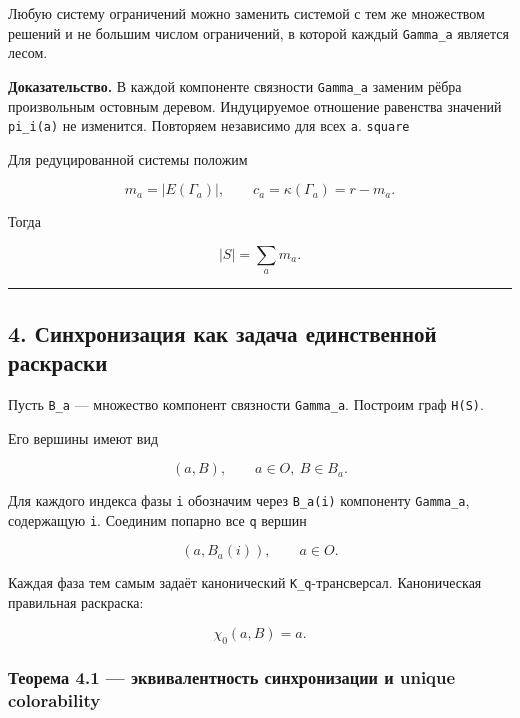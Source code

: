 Любую систему ограничений можно заменить системой с тем же множеством
решений и не большим числом ограничений, в которой каждый
\texttt{Gamma\_a} является лесом.

\textbf{Доказательство.} В каждой компоненте связности \texttt{Gamma\_a}
заменим рёбра произвольным остовным деревом. Индуцируемое отношение
равенства значений \texttt{pi\_i(a)} не изменится. Повторяем независимо
для всех \texttt{a}. \texttt{square}

Для редуцированной системы положим

\[
m_a=|E(\Gamma_a)|,
\qquad
c_a=\kappa(\Gamma_a)=r-m_a.
\tag{9}
\]

Тогда

\[
|S|=\sum_a m_a.
\tag{10}
\]

\begin{center}\rule{0.5\linewidth}{0.5pt}\end{center}

\hypertarget{ux441ux438ux43dux445ux440ux43eux43dux438ux437ux430ux446ux438ux44f-ux43aux430ux43a-ux437ux430ux434ux430ux447ux430-ux435ux434ux438ux43dux441ux442ux432ux435ux43dux43dux43eux439-ux440ux430ux441ux43aux440ux430ux441ux43aux438}{%
\subsection{4. Синхронизация как задача единственной
раскраски}\label{ux441ux438ux43dux445ux440ux43eux43dux438ux437ux430ux446ux438ux44f-ux43aux430ux43a-ux437ux430ux434ux430ux447ux430-ux435ux434ux438ux43dux441ux442ux432ux435ux43dux43dux43eux439-ux440ux430ux441ux43aux440ux430ux441ux43aux438}}

Пусть \texttt{B\_a} --- множество компонент связности \texttt{Gamma\_a}.
Построим граф \texttt{H(S)}.

Его вершины имеют вид

\[
(a,B),\qquad a\in O,\ B\in B_a.
\tag{11}
\]

Для каждого индекса фазы \texttt{i} обозначим через \texttt{B\_a(i)}
компоненту \texttt{Gamma\_a}, содержащую \texttt{i}. Соединим попарно
все \texttt{q} вершин

\[
(a,B_a(i)),\qquad a\in O.
\tag{12}
\]

Каждая фаза тем самым задаёт канонический \texttt{K\_q}-трансверсал.
Каноническая правильная раскраска:

\[
\chi_0(a,B)=a.
\tag{13}
\]

\hypertarget{ux442ux435ux43eux440ux435ux43cux430-4.1-ux44dux43aux432ux438ux432ux430ux43bux435ux43dux442ux43dux43eux441ux442ux44c-ux441ux438ux43dux445ux440ux43eux43dux438ux437ux430ux446ux438ux438-ux438-unique-colorability}{%
\subsubsection{Теорема 4.1 --- эквивалентность синхронизации и unique
colorability}\label{ux442ux435ux43eux440ux435ux43cux430-4.1-ux44dux43aux432ux438ux432ux430ux43bux435ux43dux442ux43dux43eux441ux442ux44c-ux441ux438ux43dux445ux440ux43eux43dux438ux437ux430ux446ux438ux438-ux438-unique-colorability}}

